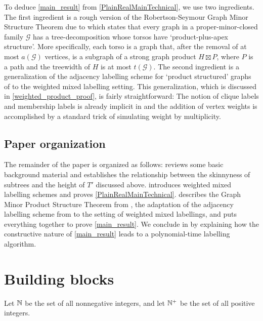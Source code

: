 \documentclass{patmorin}
\newcommand{\defin}[1]{\emph{\textcolor{brightmaroon}{#1}}}
\begin{document}
  To deduce \cref{main_result} from \cref{PlainRealMainTechnical}, we use two ingredients.  The first ingredient is a rough
  version of the Robertson-Seymour Graph Minor Structure Theorem due to \citet{dujmovic.joret.ea:planar} which states that every graph in a proper-minor-closed family $\mathcal{G}$ has a tree-decomposition whose torsos have `product-plus-apex structure'. More specifically, each torso is a graph that, after the removal of at most $a(\mathcal{G})$ vertices, is a subgraph of a strong graph product $H\boxtimes P$, where $P$ is a path and the treewidth of $H$ is at most $t(\mathcal{G})$.  The second ingredient is a generalization of the adjacency labelling scheme for `product structured' graphs of \citet{dujmovic.esperet.ea:adjacency} to the weighted mixed labelling setting.  This generalization, which is discussed in \cref{weighted_product_proof}, is fairly straightforward: The notion of clique labels and membership labels is already implicit in \cite{dujmovic.esperet.ea:adjacency} and the addition of vertex weights is accomplished by a standard trick of simulating weight by multiplicity.

\subsection{Paper organization}

  The remainder of the paper is organized as follows:   reviews some basic background material and establishes the relationship between the skinnyness of subtrees and the height of $T'$ discussed above.   introduces weighted mixed labelling schemes and proves \cref{PlainRealMainTechnical}.   describes the Graph Minor Product Structure Theorem from \cite{dujmovic.joret.ea:planar}, the adaptation of the adjacency labelling scheme from \cite{dujmovic.esperet.ea:adjacency} to the setting of weighted mixed labellings, and puts everything together to prove \cref{main_result}. We conclude in  by explaining how the constructive nature of \cref{main_result} leads to a
polynomial-time labelling algorithm.

  \section{Building blocks}\label{building_blocks}

Let \defin{$\mathbb{N}$} be the set of all nonnegative integers, and let \defin{$\mathbb{N}^+$} be the set of all positive integers.
\end{document}
